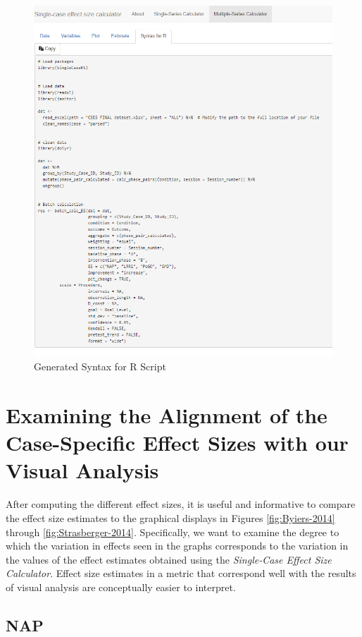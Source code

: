 \documentclass[
]{book}
\begin{document}
\begin{figure}
\includegraphics[width=0.75\linewidth]{images/multiseries_Rsyntax} \caption{Generated Syntax for R Script}\label{fig:multipleseries-syntax}
\end{figure}

\hypertarget{examining-the-alignment-of-the-case-specific-effect-sizes-with-our-visual-analysis}{%
\section{Examining the Alignment of the Case-Specific Effect Sizes with our Visual Analysis}\label{examining-the-alignment-of-the-case-specific-effect-sizes-with-our-visual-analysis}}

After computing the different effect sizes, it is useful and informative to compare the effect size estimates to the graphical displays in Figures \ref{fig:Byiers-2014} through \ref{fig:Strasberger-2014}. Specifically, we want to examine the degree to which the variation in effects seen in the graphs corresponds to the variation in the values of the effect estimates obtained using the \emph{Single-Case Effect Size Calculator}. Effect size estimates in a metric that correspond well with the results of visual analysis are conceptually easier to interpret.

\hypertarget{nap}{%
\subsection{NAP}\label{nap}}
\end{document}
